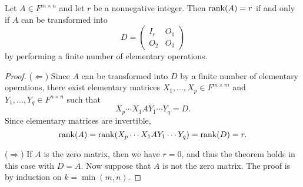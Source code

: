 \begin{theorem}
  \label{thm:mille-feuille}
  Let $A \in F^{m \times n}$ and let $r$ be a nonnegative integer.
  Then $\operatorname{rank}(A) = r$ if and only if $A$ can be transformed into
  \begin{equation*}
    D =
    \begin{pmatrix}
      I_r & O_1 \\
      O_2 & O_3
    \end{pmatrix}
  \end{equation*}
  by performing a finite number of elementary operations.  
\end{theorem}
\begin{proof}
  ($\Leftarrow$)
  Since $A$ can be transformed into $D$ by a finite number of elementary
  operations, there exist elementary matrices
  $X_1, \dots, X_p \in F^{m \times m}$ and
  $Y_1, \dots, Y_q \in F^{n \times n}$ such that
  \begin{equation*}
    X_p \cdots X_1 A Y_1 \cdots Y_q = D.
  \end{equation*}
  Since elementary matrices are invertible,
  \begin{equation*}
    \operatorname{rank}(A) = \operatorname{rank}(X_p \cdots X_1 A Y_1 \cdots Y_q) = \operatorname{rank}(D) = r.
  \end{equation*}

  ($\Rightarrow$)
  If $A$ is the zero matrix, then we have $r = 0$, and thus the theorem holds
  in this case with $D = A$.
  Now suppose that $A$ is not the zero matrix.
  The proof is by induction on $k = \min(m, n)$.
  

\end{proof}
